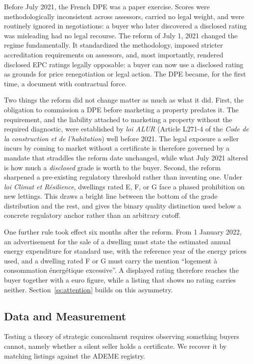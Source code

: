 Before July 2021, the French DPE was a paper exercise. Scores were methodologically inconsistent across assessors, carried no legal weight, and were routinely ignored in negotiations: a buyer who later discovered a disclosed rating was misleading had no legal recourse. The reform of July 1, 2021 changed the regime fundamentally. It standardized the methodology, imposed stricter accreditation requirements on assessors, and, most importantly, rendered disclosed EPC ratings legally opposable: a buyer can now use a disclosed rating as grounds for price renegotiation or legal action. The DPE became, for the first time, a document with contractual force.

Two things the reform did not change matter as much as what it did. First, the obligation to
commission a DPE before marketing a property predates it. The requirement, and the liability
attached to marketing a property without the required diagnostic, were established by \emph{loi
ALUR} (Article L271-4 of the \emph{Code de la construction et de l'habitation}) well before 2021.
The legal exposure a seller incurs by coming to market without a certificate is therefore governed
by a mandate that straddles the reform date unchanged, while what July 2021 altered is how much a
\emph{disclosed} grade is worth to the buyer. Second, the reform sharpened a pre-existing
regulatory threshold rather than inventing one. Under \emph{loi Climat et R\'esilience}, dwellings
rated E, F, or G face a phased prohibition on new lettings. This draws a bright line between the
bottom of the grade distribution and the rest, and gives the binary quality distinction used below
a concrete regulatory anchor rather than an arbitrary cutoff.

One further rule took effect six months after the reform. From 1 January 2022, an advertisement for the sale of a dwelling must state the estimated annual energy expenditure for standard use, with the reference year of the energy prices used, and a dwelling rated F or G must carry the mention ``logement \`a consommation \'energ\'etique excessive''. A displayed rating therefore reaches the buyer together with a euro figure, while a listing that shows no rating carries neither. Section~\ref{ss:attention} builds on this asymmetry.

\subsection{Data and Measurement}
\label{sec:data}

Testing a theory of strategic concealment requires observing something buyers cannot, namely whether
a silent seller holds a certificate. We recover it by matching listings against the ADEME registry.

